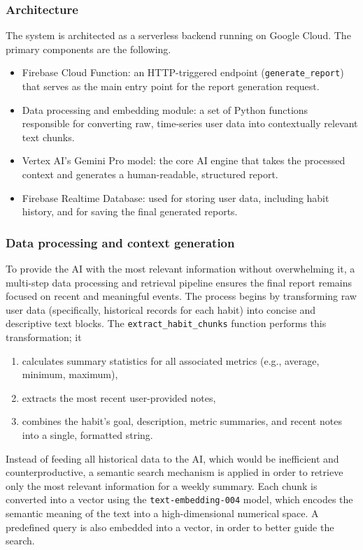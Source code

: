 \documentclass{article}
\begin{document}
\subsubsection{Architecture}

The system is architected as a serverless backend running on Google Cloud.
The primary components are the following.

\begin{itemize}
	\item Firebase Cloud Function: an HTTP-triggered endpoint (\verb|generate_report|) that serves as the main entry point for the report generation request.
	\item Data processing and embedding module: a set of Python functions responsible for converting raw, time-series user data into contextually relevant text chunks.
	\item Vertex AI’s Gemini Pro model: the core AI engine that takes the processed context and generates a human-readable, structured report.
	\item Firebase Realtime Database: used for storing user data, including habit history, and for saving the final generated reports.
\end{itemize}

\subsubsection{Data processing and context generation}

To provide the AI with the most relevant information without overwhelming it, a multi-step data processing and retrieval pipeline ensures the final report remains focused on recent and meaningful events.
The process begins by transforming raw user data (specifically, historical records for each habit) into concise and descriptive text blocks.
The \verb|extract_habit_chunks| function performs this transformation; it

\begin{enumerate}
	\item calculates summary statistics for all associated metrics (e.g., average, minimum, maximum),
	\item extracts the most recent user-provided notes,
	\item combines the habit’s goal, description, metric summaries, and recent notes into a single, formatted string.
\end{enumerate}

Instead of feeding all historical data to the AI, which would be inefficient and counterproductive, a semantic search mechanism is applied in order to retrieve only the most relevant information for a weekly summary.
Each chunk is converted into a vector using the \verb|text-embedding-004| model, which encodes the semantic meaning of the text into a high-dimensional numerical space.
A predefined query is also embedded into a vector, in order to better guide the search.
\end{document}
